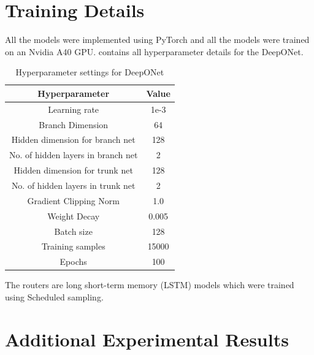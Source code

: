 \documentclass{article} %
\begin{document}
\section{Training Details} \label{sec:training details}


All the models were implemented using PyTorch and all the models were trained on an Nvidia A40 GPU.  contains all hyperparameter details for the DeepONet.

\begin{table}[h]
    \centering
    \begin{tabular}{|c|c|}
        \hline
        Hyperparameter & Value\\
        \hline \hline
        Learning rate & 1e-3 \\
        Branch Dimension & 64 \\
        Hidden dimension for branch net & 128 \\
        No. of hidden layers in branch net & 2\\
        Hidden dimension for trunk net & 128 \\
        No. of hidden layers in trunk net & 2\\
        Gradient Clipping Norm & 1.0  \\
        Weight Decay & 0.005 \\
        Batch size & 128 \\
        Training samples & 15000 \\
        Epochs & 100 \\
        \hline
    \end{tabular}
    \caption{Hyperparameter settings for DeepONet}
    \label{tab:hpsettings}
\end{table}

The routers are long short-term memory (LSTM) models which were trained using Scheduled sampling. 


\section{Additional Experimental Results} \label{sec:moreexperimentalresults}
\end{document}
